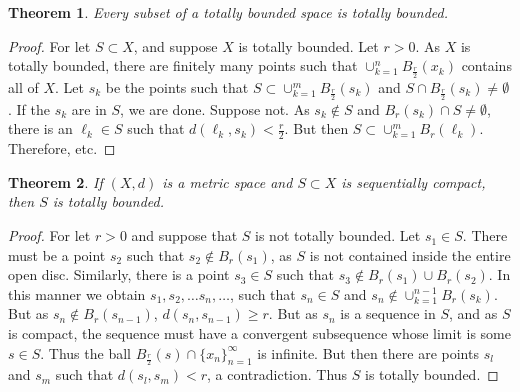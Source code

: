 \documentclass[12pt,oneside]{book}
\theoremstyle{mystyle}
\newtheorem{theorem}{Theorem}[section]
\begin{document}
\begin{theorem}
Every subset of a totally bounded space is totally bounded.
\end{theorem}
\begin{proof}
For let $S\subset X$, and suppose $X$ is totally bounded. Let $r>0$. As $X$ is totally bounded, there are finitely many points such that $\cup_{k=1}^{n} B_{\frac{r}{2}}(x_k)$ contains all of $X$. Let $s_k$ be the points such that $S\subset \cup_{k=1}^{m} B_{\frac{r}{2}}(s_k)$ and $S\cap B_{\frac{r}{2}}(s_k) \ne \emptyset$. If the $s_k$ are in $S$, we are done. Suppose not. As $s_k \notin S$ and $B_{r}(s_k)\cap S \ne \emptyset$, there is an $\ell_k \in S$ such that $d(\ell_k,s_k)< \frac{r}{2}$. But then $S\subset \cup_{k=1}^{m} B_{r}(\ell_k)$. Therefore, etc.
\end{proof}

\begin{theorem}
If $(X,d)$ is a metric space and $S\subset X$ is sequentially compact, then $S$ is totally bounded.
\end{theorem}
\begin{proof}
For let $r>0$ and suppose that $S$ is not totally bounded. Let $s_1\in S$. There must be a point $s_2$ such that $s_2 \notin B_{r}(s_1)$, as $S$ is not contained inside the entire open disc. Similarly, there is a point $s_3\in S$ such that $s_3 \notin B_r(s_1)\cup B_r(s_2)$. In this manner we obtain $s_1, s_2, \hdots s_n, \hdots$, such that $s_n \in S$ and $s_n \notin \cup_{k=1}^{n-1}B_r(s_k)$. But as $s_n \notin B_r(s_{n-1})$, $d(s_n, s_{n-1})\geq r$. But as $s_n$ is a sequence in $S$, and as $S$ is compact, the sequence must have a convergent subsequence whose limit is some $s\in S$. Thus the ball $B_{\frac{r}{2}}(s)\cap \{x_n\}_{n=1}^{\infty}$ is infinite. But then there are points $s_{l}$ and $s_{m}$ such that $d(s_l,s_m)<r$, a contradiction. Thus $S$ is totally bounded.
\end{proof}
\end{document}
